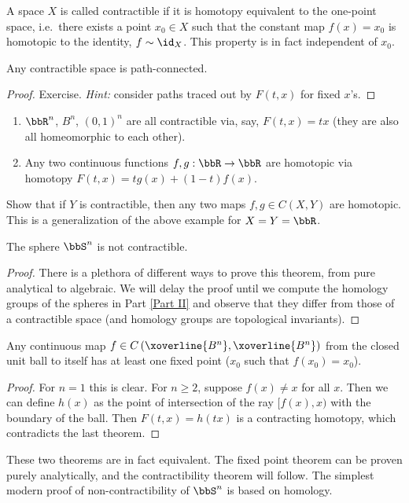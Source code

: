 \begin{defn}
A space $X$ is called contractible if it is homotopy equivalent to the one-point space, i.e.\ there exists a point $x_0\in X$ such that the constant map $f(x)=x_0$ is homotopic to the identity, $f\sim \id_X$. This property is in fact independent of $x_0$.
\end{defn}
\begin{prop}
Any contractible space is path-connected.
\end{prop}
\begin{proof}
Exercise. \emph{Hint:} consider paths traced out by $F(t,x)$ for fixed $x$'s.
\end{proof}
\begin{example}
\begin{enumerate}
    \item $\bbR^n$, $B^n$, $(0,1)^n$ are all contractible via, say, $F(t,x)=tx$ (they are also all homeomorphic to each other).
    \item Any two continuous functions $f,g:\bbR \to\bbR $ are homotopic via homotopy $F(t,x)=tg(x)+(1-t)f(x)$.
\end{enumerate}
\end{example}
\begin{xca}
Show that if $Y$ is contractible, then any two maps $f,g\in C(X,Y)$ are homotopic. This is a generalization of the above example for $X=Y=\bbR $.
\end{xca}
\begin{thm}[Brouwer]
The sphere $\bbS^n$ is not contractible.
\end{thm}
\begin{proof}
    There is a plethora of different ways to prove this theorem, from pure analytical to algebraic. We will delay the proof until we compute the homology groups of the spheres in Part \ref{Part II} and observe that they differ from those of a contractible space (and homology groups are topological invariants).
\end{proof}
\begin{thm}\label{thm Brouwer's fixed point}
Any continuous map $f\in C\left(\xoverline{B^n},\xoverline{B^n}\right)$  from the closed unit ball to itself has at least one fixed point ($x_0$ such that $f(x_0)=x_0$).
\end{thm}
\begin{proof}
For $n=1$ this is clear. For $n\geq 2$, suppose $f(x)\neq x$ for all $x$. Then we can define $h(x)$ as the point of intersection of the ray $[f(x),x)$ with the boundary of the ball. Then $F(t,x)=h(tx)$ is a contracting homotopy, which contradicts the last theorem.
\end{proof}
\begin{rem}
These two theorems are in fact equivalent. The fixed point theorem can be proven purely analytically, and the contractibility theorem will follow. The simplest modern proof of non-contractibility of $\bbS^n$ is based on homology.
\end{rem}

